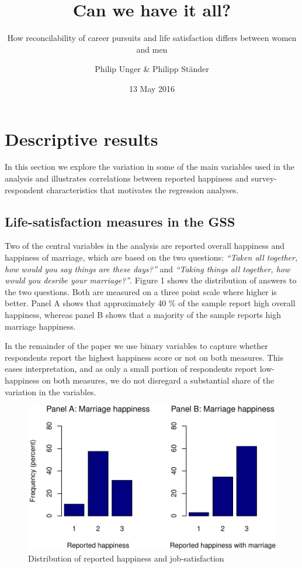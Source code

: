 \documentclass[]{article}
\title{Can we have it all?}
\subtitle{How reconcilability of career pursuits and life satisfaction differs
between women and men}
\author{Philip Unger \& Philipp Ständer}
\date{13 May 2016}
\begin{document}
\maketitle

{
\setcounter{tocdepth}{2}
\tableofcontents
}
\pagebreak

\section{Descriptive results}\label{descriptive-results}

In this section we explore the variation in some of the main variables
used in the analysis and illustrates correlations between reported
happiness and survey-respondent characteristics that motivates the
regression analyses.

\subsection{Life-satisfaction measures in the
GSS}\label{life-satisfaction-measures-in-the-gss}

Two of the central variables in the analysis are reported overall
happiness and happiness of marriage, which are based on the two
questions: \emph{``Taken all together, how would you say things are
these days?''} and \emph{``Taking things all together, how would you
desribe your marriage?''}. Figure 1 shows the distribution of answers to
the two questions. Both are measured on a three point scale where higher
is better. Panel A shows that approximately 40 \% of the sample report
high overall happiness, whereas panel B shows that a majority of the
sample reports high marriage happiness.

In the remainder of the paper we use binary variables to capture whether
respondents report the highest happiness score or not on both measures.
This eases interpretation, and as only a small portion of respondents
report low-happiness on both measures, we do not disregard a substantial
share of the variation in the variables.

\begin{figure}[htbp]
\centering
\includegraphics{Final_Project_P-P_analysis_Unger_files/figure-latex/unnamed-chunk-3-1.pdf}
\caption{Distribution of reported happiness and job-satisfaction}
\end{figure}
\end{document}
